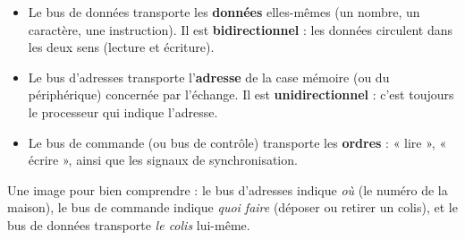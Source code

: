 \documentclass[11pt]{article}
\newcommand{\cle}[1]{{\popxbold\color{popdark}#1}}
\begin{document}
\begin{propriete}
\begin{itemize}
  \item Le \cle{bus de données} transporte les \textbf{données} elles-mêmes (un nombre, un caractère, une instruction). Il est \textbf{bidirectionnel} : les données circulent dans les deux sens (lecture et écriture).
  \item Le \cle{bus d'adresses} transporte l'\textbf{adresse} de la case mémoire (ou du périphérique) concernée par l'échange. Il est \textbf{unidirectionnel} : c'est toujours le processeur qui indique l'adresse.
  \item Le \cle{bus de commande} (ou bus de contrôle) transporte les \textbf{ordres} : « lire », « écrire », ainsi que les signaux de synchronisation.
\end{itemize}
\end{propriete}

Une image pour bien comprendre : le bus d'adresses indique \emph{où} (le numéro de la maison), le bus de commande indique \emph{quoi faire} (déposer ou retirer un colis), et le bus de données transporte \emph{le colis} lui-même.
\end{document}
